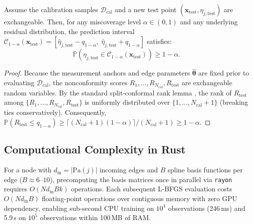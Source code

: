 \begin{proposition}
\label{prop:conformal}
Assume the calibration samples $\mathcal{D}_{\mathrm{cal}}$ and a new test point $(\mathbf{x}_{\mathrm{test}}, \eta_{j,\mathrm{test}})$ are exchangeable. Then, for any miscoverage level $\alpha \in (0, 1)$ and any underlying residual distribution, the prediction interval $\mathcal{C}_{1-\alpha}(\mathbf{x}_{\mathrm{test}}) = [\hat{\eta}_{j,\mathrm{test}} - q_{1-\alpha},\; \hat{\eta}_{j,\mathrm{test}} + q_{1-\alpha}]$ satisfies:
\begin{equation}
  \mathbb{P}\!\left(\eta_{j,\mathrm{test}} \in \mathcal{C}_{1-\alpha}(\mathbf{x}_{\mathrm{test}})\right) \ge 1 - \alpha.
\end{equation}
\end{proposition}

\begin{proof}
Because the measurement anchors and edge parameters $\hat{\boldsymbol{\theta}}$ are fixed prior to evaluating $\mathcal{D}_{\mathrm{cal}}$, the nonconformity scores $R_1, \dots, R_{N_{\mathrm{cal}}}, R_{\mathrm{test}}$ are exchangeable random variables. By the standard split-conformal rank lemma \citep{lei2018distribution}, the rank of $R_{\mathrm{test}}$ among $\{R_1, \dots, R_{N_{\mathrm{cal}}}, R_{\mathrm{test}}\}$ is uniformly distributed over $\{1, \dots, N_{\mathrm{cal}} + 1\}$ (breaking ties conservatively). Consequently, $\mathbb{P}(R_{\mathrm{test}} \le q_{1-\alpha}) \ge \lceil (N_{\mathrm{cal}} + 1)(1 - \alpha) \rceil / (N_{\mathrm{cal}} + 1) \ge 1 - \alpha$.
\end{proof}

\subsection{Computational Complexity in Rust}
For a node with $d_{\mathrm{in}} = |\mathrm{Pa}(j)|$ incoming edges and $B$ spline basis functions per edge ($B \approx 6\text{--}10$), precomputing the basis matrices once in parallel via \texttt{rayon} requires $O(N d_{\mathrm{in}} B k)$ operations. Each subsequent L-BFGS evaluation costs $O(N d_{\mathrm{in}} B)$ floating-point operations over contiguous memory with zero GPU dependency, enabling sub-second CPU training on $10^4$ observations (246\,ms) and 5.9\,s on $10^5$ observations within 100\,MB of RAM.
